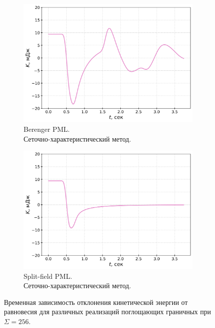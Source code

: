 \begin{figure}[htb]
\vspace{0.5cm}\\
    \begin{subfigure}{0.475\textwidth}
        \centering
        \includegraphics[width=1.0\textwidth]{images/pml/osc_gcm_Berenger.png}
        \caption{Berenger PML.\\Сеточно-характеристический метод.}
        \label{fig:osc_gcm_berenger}
    \end{subfigure}
\hfill
    \begin{subfigure}{0.475\textwidth}
        \centering
        \includegraphics[width=1.0\textwidth]{images/pml/osc_gcm_split-field.png}
        \caption{Split-field PML.\\Сеточно-характеристический метод.}
        \label{fig:osc_gcm_split}
    \end{subfigure}
\caption{Временная зависимость отклонения кинетической энергии от равновесия для различных реализаций поглощающих граничных при $\Sigma=256$.}
\label{fig:osc_pml}
\end{figure}


